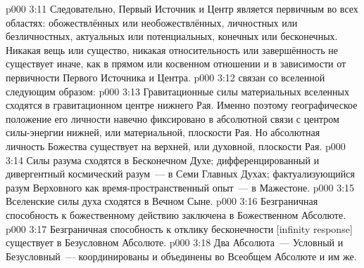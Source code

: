 \vs p000 3:11 Следовательно, Первый Источник и Центр является первичным во всех областях: обожествлённых или необожествлённых, личностных или безличностных, актуальных или потенциальных, конечных или бесконечных. Никакая вещь или существо, никакая относительность или завершённость не существует иначе, как в прямом или косвенном отношении и в зависимости от первичности Первого Источника и Центра.
\vs p000 3:12 \pc {} связан со вселенной следующим образом:
\vs p000 3:13 Гравитационные силы материальных вселенных сходятся в гравитационном центре нижнего Рая. Именно поэтому географическое положение его личности навечно фиксировано в абсолютной связи с центром силы\hyp{}энергии нижней, или материальной, плоскости Рая. Но абсолютная личность Божества существует на верхней, или духовной, плоскости Рая.
\vs p000 3:14 Силы разума сходятся в Бесконечном Духе; дифференцированный и дивергентный космический разум~--- в Семи Главных Духах; фактуализующийся разум Верховного как время\hyp{}пространственный опыт~--- в Мажестоне.
\vs p000 3:15 Вселенские силы духа сходятся в Вечном Сыне.
\vs p000 3:16 Безграничная способность к божественному действию заключена в Божественном Абсолюте.
\vs p000 3:17 Безграничная способность к отклику бесконечности [infinity response] существует в Безусловном Абсолюте.
\vs p000 3:18 Два Абсолюта~--- Условный и Безусловный~--- координированы и объединены во Всеобщем Абсолюте и им же.
